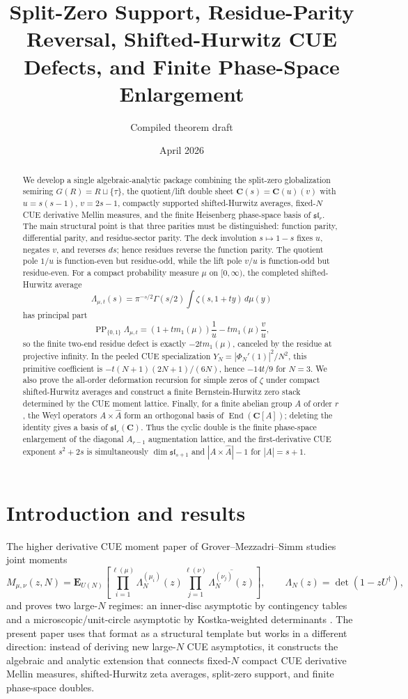 \documentclass[11pt]{article}
\title{Split-Zero Support, Residue-Parity Reversal, Shifted-Hurwitz CUE Defects, and Finite Phase-Space Enlargement}
\author{Compiled theorem draft}
\date{April 2026}
\newcommand{\C}{\mathbf C}
\newcommand{\PP}{\operatorname{PP}}
\newcommand{\End}{\operatorname{End}}
\theoremstyle{plain}
\theoremstyle{definition}
\numberwithin{equation}{section}
\begin{document}
\maketitle

\begin{abstract}
We develop a single algebraic-analytic package combining the split-zero globalization semiring
\(G(R)=R\sqcup\{\tau\}\), the quotient/lift double sheet
\(\C(s)=\C(u)(v)\) with \(u=s(s-1)\), \(v=2s-1\), compactly supported shifted-Hurwitz averages, fixed-\(N\) CUE derivative Mellin measures, and the finite Heisenberg phase-space basis of \(\mathfrak{sl}_r\).  The main structural point is that three parities must be distinguished: function parity, differential parity, and residue-sector parity.  The deck involution \(s\mapsto 1-s\) fixes \(u\), negates \(v\), and reverses \(ds\); hence residues reverse the function parity.  The quotient pole \(1/u\) is function-even but residue-odd, while the lift pole \(v/u\) is function-odd but residue-even.  For a compact probability measure \(\mu\) on \([0,\infty)\), the completed shifted-Hurwitz average
\[
 \Lambda_{\mu,t}(s)=\pi^{-s/2}\Gamma(s/2)\int \zeta(s,1+ty)\,d\mu(y)
\]
has principal part
\[
 \PP_{\{0,1\}}\Lambda_{\mu,t}=(1+t m_1(\mu))\frac1u-tm_1(\mu)\frac vu,
\]
so the finite two-end residue defect is exactly \(-2tm_1(\mu)\), canceled by the residue at projective infinity.  In the peeled CUE specialization \(Y_N=|\Phi_N'(1)|^2/N^2\), this primitive coefficient is \(-t(N+1)(2N+1)/(6N)\), hence \(-14t/9\) for \(N=3\).  We also prove the all-order deformation recursion for simple zeros of \(\zeta\) under compact shifted-Hurwitz averages and construct a finite Bernstein-Hurwitz zero stack determined by the CUE moment lattice.  Finally, for a finite abelian group \(A\) of order \(r\), the Weyl operators \(A\times\widehat A\) form an orthogonal basis of \(\End(\C[A])\); deleting the identity gives a basis of \(\mathfrak{sl}_r(\C)\).  Thus the cyclic double is the finite phase-space enlargement of the diagonal \(A_{r-1}\) augmentation lattice, and the first-derivative CUE exponent \(s^2+2s\) is simultaneously \(\dim\mathfrak{sl}_{s+1}\) and \(|A\times\widehat A|-1\) for \(|A|=s+1\).
\end{abstract}

\section{Introduction and results}

The higher derivative CUE moment paper of Grover--Mezzadri--Simm studies joint moments
\[
M_{\mu,\nu}(z,N)=\mathbf E_{U(N)}\left[
\prod_{i=1}^{\ell(\mu)}\Lambda_N^{(\mu_i)}(z)
\prod_{j=1}^{\ell(\nu)}\overline{\Lambda_N^{(\nu_j)}(z)}\right],
\qquad
\Lambda_N(z)=\det(1-zU^\dagger),
\]
and proves two large-\(N\) regimes: an inner-disc asymptotic by contingency tables and a microscopic/unit-circle asymptotic by Kostka-weighted determinants \cite{GMS}.  The present paper uses that format as a structural template but works in a different direction: instead of deriving new large-\(N\) CUE asymptotics, it constructs the algebraic and analytic extension that connects fixed-\(N\) compact CUE derivative Mellin measures, shifted-Hurwitz zeta averages, split-zero support, and finite phase-space doubles.
\end{document}
